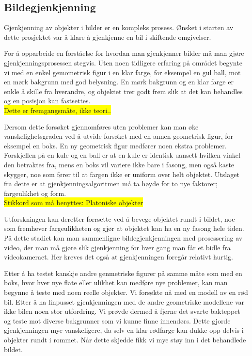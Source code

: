 \subsection{Bildegjenkjenning}

Gjenkjenning av objekter i bilder er en kompleks prosess. Ønsket i starten av dette prosjektet var å klare å gjenkjenne en bil i skiftende omgivelser. 

For å opparbeide en forståelse for hvordan man gjenkjenner bilder må man gjøre gjenkjenningsprosessen stegvis. Uten noen tidligere erfaring på området begynte vi med en enkel gemometrisk figur i en klar farge, for eksempel en gul ball, mot en mørk bakgrunn med god belysning. En mørk bakgrunn og en klar farge er enkle å skille fra hverandre, og objektet trer godt frem slik at det kan behandles og en posisjon kan fastsettes.\\\colorbox{yellow}{Dette er fremgangsmåte, ikke teori..}

Dersom dette forsøket gjennomføres uten problemer kan man øke vanskelighetsgraden ved å utvide forsøket med en annen geometrisk figur, for eksempel en boks. En ny geometrisk figur medfører noen ekstra problemer. Forskjellen på en kule og en ball er at en kule er identisk uansett hvilken vinkel den betraktes fra, mens en boks vil variere ikke bare i fasong, men også kaste skygger, noe som fører til at fargen ikke er uniform over helt objektet. Utslaget fra dette er at gjenkjenningsalgoritmen må ta høyde for to nye faktorer; fargeulikhet og form. \\\colorbox{yellow}{Stikkord som må benyttes: Platoniske objekter}

Utforskningen kan deretter forrsette ved å bevege objektet rundt i bildet, noe som fremhever fargeulikheten og gjør at objektet kan ha en ny fasong hele tiden. På dette stadiet kan man sammenligne bildegjenkjenningen med prosessering av video, der man må gjøre slik gjenkjenning for hver gang man får et bidle fra videokameraet. Her kreves det også at gjenkjenningen foregår relativt hurtig. 

Etter å ha testet kanskje andre genmetriske figurer på samme måte som med en boks, hvor hver nye flate eller ulikhet kan medføre nye problemer, kan man begynne å teste med noen reelle objekter. Vi forsøkte nå med en modell av en rød bil. Etter å ha finpusset gjenkjenningen med de andre geometriske modellene var ikke bilen noen stor utfordring. Vi prøvde dermed å fjerne det svarte bakteppet og teste mot diverse bakgrunner som vi kunne finne innendørs. Dette gjorde gjenkjenningen mye vanskeligere, da selv en klar rødfarge kan dukke opp delvis i objekter rundt i rommet. Når dette skjedde fikk vi mye støy inn i det behandlede bildet.

